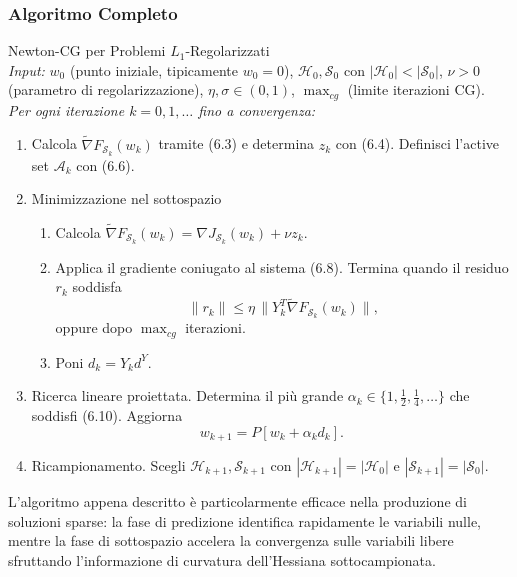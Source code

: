 \documentclass[a4paper,12pt]{article}
\begin{document}
\newpage
\subsubsection{Algoritmo Completo}

\begin{actionbox}
  Newton-CG per Problemi $L_1$-Regolarizzati\\[0.3cm]
  \textit{Input:} $w_0$ (punto iniziale, tipicamente $w_0=0$),
  $\mathcal{H}_0, \mathcal{S}_0$ con $|\mathcal{H}_0| < |\mathcal{S}_0|$,
  $\nu > 0$ (parametro di regolarizzazione),
  $\eta, \sigma \in (0,1)$,
  $\operatorname{max}_{cg}$ (limite iterazioni CG).\\[0.1cm]
  
  \textit{Per ogni iterazione $k = 0, 1, \dots$ fino a convergenza:}
  \begin{enumerate}
    \item
    Calcola $\widetilde{\nabla}F_{\mathcal{S}_k}(w_k)$ tramite (6.3) e
    determina $z_k$ con (6.4). Definisci l'active set $\mathcal{A}_k$ con (6.6).
    
    \item Minimizzazione nel sottospazio
    \begin{enumerate}
      \item Calcola $\widetilde{\nabla}F_{\mathcal{S}_k}(w_k) = \nabla J_{\mathcal{S}_k}(w_k) + \nu z_k$.
      \item Applica il gradiente coniugato al sistema (6.8). Termina quando
      il residuo $r_k$ soddisfa
      \[
      \|r_k\| \le \eta \, \|Y_k^T \widetilde{\nabla}F_{\mathcal{S}_k}(w_k)\|, \tag{6.11}
      \]
      oppure dopo $\operatorname{max}_{cg}$ iterazioni.
      \item Poni $d_k = Y_k d^Y$.
    \end{enumerate}
    
    \item Ricerca lineare proiettata.
    Determina il più grande $\alpha_k \in \{1, \frac{1}{2}, \frac{1}{4}, \dots\}$
    che soddisfi (6.10). Aggiorna
    \[
    w_{k+1} = P[w_k + \alpha_k d_k].
    \]
    
    \item Ricampionamento.
    Scegli $\mathcal{H}_{k+1}, \mathcal{S}_{k+1}$ con
    $|\mathcal{H}_{k+1}| = |\mathcal{H}_0|$ e
    $|\mathcal{S}_{k+1}| = |\mathcal{S}_0|$.
  \end{enumerate}
\end{actionbox}

\begin{notebox}
  L'algoritmo appena descritto è particolarmente efficace nella produzione di
  soluzioni sparse: la fase di predizione identifica rapidamente le variabili
  nulle, mentre la fase di sottospazio accelera la convergenza sulle variabili
  libere sfruttando l'informazione di curvatura dell'Hessiana sottocampionata.
\end{notebox}
\end{document}
